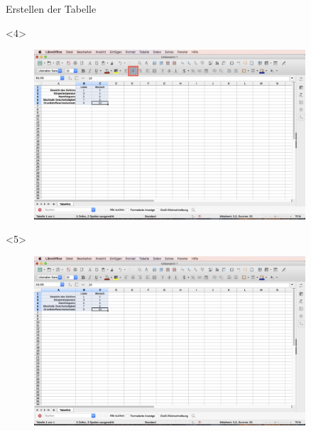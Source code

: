 \documentclass["WS\space 16-17\space -\space LaTeX-Kurs\space -\space Praesentation\space -\space 2.tex"]{subfiles}
\begin{document}
\begin{frame}[c]{Erstellen der Tabelle}
\begin{onlyenv}
\begin{figure}[htbp]
		\end{figure}
	\end{onlyenv}
	\begin{onlyenv}
		\begin{figure}[htbp]
			\centering
			\includegraphics[width=0.9\textwidth]{img/Bildschirmfoto_mitKasten/3_Tabelle/4.jpg}
		\end{figure}
	\end{onlyenv}
	\begin{onlyenv}
		\begin{figure}[htbp]
			\centering
			\includegraphics[width=0.9\textwidth]{img/Bildschirmfoto_mitKasten/3_Tabelle/5.jpg}
		\end{figure}
	\end{onlyenv}
\end{frame}
\end{document}
